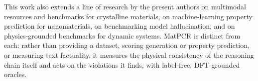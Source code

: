 \documentclass[pdflatex,sn-nature]{sn-jnl}
\providecommand{\DIFdelbeginFL}{} %
\providecommand{\DIFscaledelfig}{0.5}
\newlength{\DIFdelgraphicswidth} %
\newlength{\DIFdelgraphicsheight} %
\providecommand{\DIFdelincludegraphics}[2][]{%
\sbox{\DIFdelgraphicsbox}{\DIFOincludegraphics[#1]{#2}}%
\settoboxwidth{\DIFdelgraphicswidth}{\DIFdelgraphicsbox} %
\settoboxtotalheight{\DIFdelgraphicsheight}{\DIFdelgraphicsbox} %
\scalebox{\DIFscaledelfig}{%
\parbox[b]{\DIFdelgraphicswidth}{\usebox{\DIFdelgraphicsbox}\\[-\baselineskip] \rule{\DIFdelgraphicswidth}{0em}}\llap{\resizebox{\DIFdelgraphicswidth}{\DIFdelgraphicsheight}{%
\setlength{\unitlength}{\DIFdelgraphicswidth}%
\begin{picture}(1,1)%
\thicklines\linethickness{2pt} %
{\color[rgb]{1,0,0}\put(0,0){\framebox(1,1){}}}%
{\color[rgb]{1,0,0}\put(0,0){\line( 1,1){1}}}%
{\color[rgb]{1,0,0}\put(0,1){\line(1,-1){1}}}%
\end{picture}%
}\hspace*{3pt}}} %
} %
\DeclareRobustCommand{\DIFdelbeginFL}{\DIFOdelbeginFL \let\includegraphics\DIFdelincludegraphics} %
\begin{document}
This work also extends a line of research by the present authors on multimodal
resources and benchmarks for crystalline
materials,\cite{polat2025crysmtm,polat2026extrapolation} on machine-learning property
prediction for nanomaterials,\cite{polat2025quantumshellnet,polat2024multimodalnp} on
benchmarking model hallucination,\cite{abdaljalil2025halluverse} and on
physics-grounded benchmarks for dynamic systems.\cite{khanbayov2026iris} MatPCR is
distinct from each: rather than providing a dataset, scoring generation or property
prediction, or measuring text factuality, it measures the physical consistency of the
reasoning chain itself and acts on the violations it finds, with label-free, DFT-grounded
oracles.

\begin{figure}[t]
\centering
\DIFdelbeginFL %

\end{figure}
\end{document}
